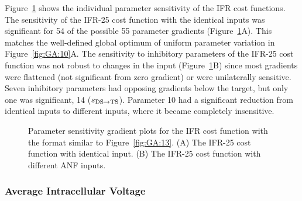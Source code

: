 Figure~\ref{fig:GA:14} shows the individual parameter sensitivity of the
IFR cost functions.  The sensitivity of the IFR-25 cost function with
the identical inputs was significant for 54 of the possible 55
parameter gradients (Figure~\ref{fig:GA:14}A).  This matches the
well-defined global optimum of uniform parameter variation in
Figure~\ref{fig:GA:10}A.  The sensitivity to inhibitory parameters of the
IFR-25 cost function was not robust to changes in the {\ANF} input
(Figure~\ref{fig:GA:14}B) since most gradients were flattened (not
significant from zero gradient) or were unilaterally sensitive.  Seven
inhibitory parameters had opposing gradients below the target, but
only one was significant, 14 ($s_{{\rm DS}\to {\rm TS}} $). Parameter
10 had a significant reduction from identical inputs to different
inputs, where it became completely insensitive. %



\begin{figure}[th]
  \centering
 \caption{Parameter sensitivity gradient plots for the IFR cost function
    with the format similar to Figure~\ref{fig:GA:13}. (A) The IFR-25 cost
    function with identical input. (B) The IFR-25 cost function with
    different {ANF} inputs. %
}
  \label{fig:GA:14}
\end{figure}


\subsubsection{Average Intracellular Voltage}

